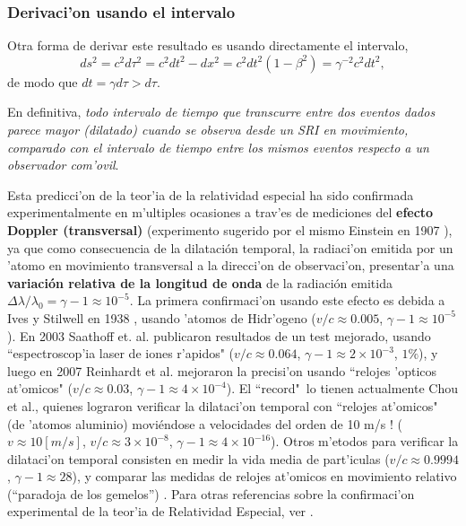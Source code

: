 \subsubsection{Derivaci'on usando el intervalo}

Otra forma de derivar este resultado es usando directamente el intervalo,
\begin{equation}
 ds^2=c^2d\tau^2=c^2dt^2-dx^2=c^2dt^2(1-\beta^2)=\gamma^{-2}c^2dt^2,
\end{equation}
de modo que $dt=\gamma d\tau>d\tau$.


En definitiva, \textit{todo intervalo de tiempo que transcurre entre dos eventos dados parece mayor (dilatado) cuando se observa desde un SRI en movimiento, comparado con el intervalo de tiempo entre los mismos eventos respecto a un observador com'ovil}.

Esta predicci'on de la teor'ia de la relatividad especial ha sido confirmada experimentalmente en m'ultiples ocasiones a trav'es de mediciones del \textbf{efecto Doppler (transversal)} (experimento sugerido por el mismo Einstein en 1907 \cite{Einstein07}), ya que como consecuencia de la dilatación temporal, la radiaci'on emitida por un 'atomo en movimiento transversal a la direcci'on de observaci'on, presentar'a una \textbf{variación relativa de la longitud de onda} de la radiación emitida $\Delta\lambda/\lambda_0=\gamma-1\approx 10^{-5}$. La primera confirmaci'on usando este efecto es debida a Ives y Stilwell en 1938 \cite{IS38}, usando 'atomos de Hidr'ogeno  ($v/c\approx 0.005$, $\gamma-1\approx 10^{-5}$). En 2003 Saathoff et. al. publicaron resultados de un test mejorado, usando ``espectroscop'ia laser de iones r'apidos" \cite{Saathoff03} ($v/c\approx 0.064$, $\gamma-1\approx 2\times 10^{-3}$, $1\%$), y luego en 2007 Reinhardt et al. mejoraron la precisi'on usando ``relojes 'opticos at'omicos" \cite{Reinhardt07} ($v/c\approx 0.03$, $\gamma-1\approx 4\times 10^{-4}$). El ``record"\, lo tienen actualmente Chou et al., quienes lograron verificar la dilataci'on temporal con ``relojes at'omicos" (de 'atomos aluminio) moviéndose a velocidades del orden de 10 m/s ! \cite{Chou10} ($v\approx 10 [m/s]$, $v/c\approx 3\times 10^{-8}$, $\gamma-1\approx 4\times 10^{-16}$). Otros m'etodos para verificar la dilataci'on temporal consisten en medir la vida media de part'iculas \cite{Bailey77} ($v/c\approx 0.9994$, $\gamma-1\approx 28$), y comparar las medidas de relojes at'omicos en movimiento relativo (``paradoja de los gemelos'') \cite{HK72a,HK72b}. Para otras referencias sobre la confirmaci'on experimental de la teor'ia de Relatividad Especial, ver \cite{SRexp}.

